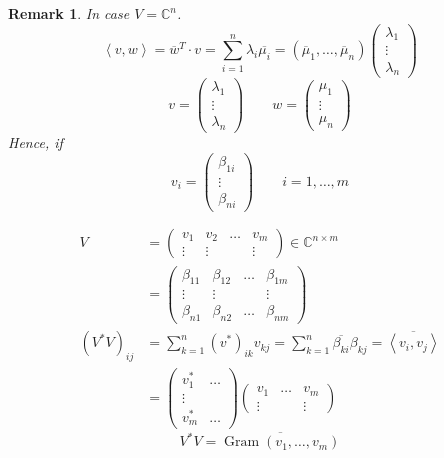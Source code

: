 \documentclass{article}
\newcounter{lecref}[section]
\numberwithin{lecref}{section}
\newtheorem{remark}[lecref]{Remark}
\newcommand{\ip}[2]{\left\langle#1,#2\right\rangle} %
\begin{document}
\begin{remark} %
  In case $V = \mathbb C^n$.
  \[ \ip vw = \overline{w}^T \cdot v = \sum_{i=1}^n \lambda_i \overline{\mu_i} = (\overline \mu_1, \ldots, \overline \mu_n)\begin{pmatrix} \lambda_1 \\ \vdots \\ \lambda_n \end{pmatrix} \]
  \[ v = \begin{pmatrix} \lambda_1 \\ \vdots \\ \lambda_n \end{pmatrix} \qquad w = \begin{pmatrix} \mu_1 \\ \vdots \\ \mu_n \end{pmatrix} \]
  Hence, if
  \[ v_i = \begin{pmatrix} \beta_{1i} \\ \vdots \\ \beta_{ni} \end{pmatrix} \qquad i = 1, \ldots, m \]

  \begin{align*}
    V &= \begin{pmatrix} v_1 & v_2 & \ldots & v_m \\ \vdots & \vdots & & \vdots \end{pmatrix} \in \mathbb C^{n \times m} \\
      &= \begin{pmatrix} \beta_{11} & \beta_{12} & \ldots & \beta_{1m} \\ \vdots & \vdots & & \vdots \\ \beta_{n1} & \beta_{n2} & \ldots & \beta_{nm} \end{pmatrix} \\
    (V^*V)_{ij} &= \sum_{k=1}^n (v^*)_{ik} v_{kj} = \sum_{k=1}^n \overline{\beta_{ki}} \beta_{kj} = \overline{\ip{v_i}{v_j}} \\
      &= \begin{pmatrix} v_1^* & \ldots \\ \vdots & \\ v_m^* & \ldots \end{pmatrix} \begin{pmatrix} v_1 & \ldots & v_m \\ \vdots &  & \vdots \end{pmatrix}
  \end{align*}
  \[ V^* V = \overline{\operatorname{Gram}(v_1, \ldots, v_m)} \]
\end{remark}
\end{document}
